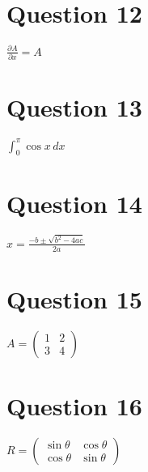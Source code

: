\documentclass{article}
\begin{document}
\section{Question 12}

$\frac{\partial A}{\partial x} = A$

\section{Question 13}

$\int_{0}^{\pi}\cos x \, dx$

\section{Question 14}

$x = \frac{-b \pm \sqrt{b ^ 2 - 4 a c}}{2 a}$

\section{Question 15}

$A = 
\left(\begin{array}{cc}
1 & 2 \\
3 & 4
\end{array}\right)$

\section{Question 16}

$R = 
\left(\begin{array}{cc}
\sin \theta & \cos \theta \\
\cos \theta & \sin \theta
\end{array}\right)$
\end{document}
